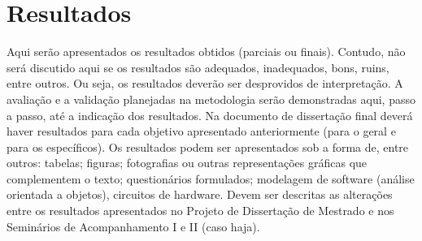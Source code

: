 \chapter{Resultados}
\label{chap:result}

Aqui serão apresentados os resultados obtidos (parciais ou finais). Contudo, não será discutido aqui se os resultados são adequados, inadequados, bons, ruins, entre outros. Ou seja, os resultados deverão ser desprovidos de interpretação. A avaliação e a validação planejadas na metodologia serão demonstradas aqui, passo a passo, até a indicação dos resultados. Na documento de dissertação final deverá haver resultados para cada objetivo apresentado anteriormente (para o geral e para os específicos).
Os resultados podem ser apresentados sob a forma de, entre outros: tabelas; figuras; fotografias ou outras representações gráficas que complementem o texto; questionários formulados; modelagem de software (análise orientada a objetos), circuitos de hardware.
Devem ser descritas as alterações entre os resultados apresentados no Projeto de Dissertação de Mestrado e nos Seminários de Acompanhamento I e II (caso haja).

